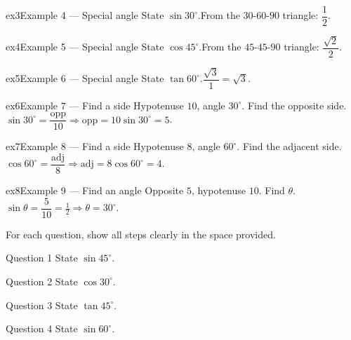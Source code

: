 \documentclass[11pt]{article}
\begin{document}
\begin{example}{ex3}{Example 4 --- Special angle}
State $\sin30^\circ$.\soln From the $30$-$60$-$90$ triangle: $\dfrac12$.
\end{example}

\begin{example}{ex4}{Example 5 --- Special angle}
State $\cos45^\circ$.\soln From the $45$-$45$-$90$ triangle: $\dfrac{\sqrt2}{2}$.
\end{example}

\begin{example}{ex5}{Example 6 --- Special angle}
State $\tan60^\circ$.\soln $\dfrac{\sqrt3}{1}=\sqrt3$.
\end{example}

\begin{example}{ex6}{Example 7 --- Find a side}
Hypotenuse $10$, angle $30^\circ$. Find the opposite side.\soln $\sin30^\circ=\dfrac{\text{opp}}{10}\Rightarrow\text{opp}=10\sin30^\circ=5$.
\end{example}

\begin{example}{ex7}{Example 8 --- Find a side}
Hypotenuse $8$, angle $60^\circ$. Find the adjacent side.\soln $\cos60^\circ=\dfrac{\text{adj}}{8}\Rightarrow\text{adj}=8\cos60^\circ=4$.
\end{example}

\begin{example}{ex8}{Example 9 --- Find an angle}
Opposite $5$, hypotenuse $10$. Find $\theta$.\soln $\sin\theta=\dfrac{5}{10}=\tfrac12\Rightarrow\theta=30^\circ$.
\end{example}

\clearpage
{}
For each question, show all steps clearly in the space provided.

\begin{qbox}{Question 1}
State $\sin45^\circ$.\workspace{2.4cm}
\end{qbox}

\begin{qbox}{Question 2}
State $\cos30^\circ$.\workspace{2.4cm}
\end{qbox}

\begin{qbox}{Question 3}
State $\tan45^\circ$.\workspace{2.4cm}
\end{qbox}

\begin{qbox}{Question 4}
State $\sin60^\circ$.\workspace{2.4cm}
\end{qbox}
\end{document}
